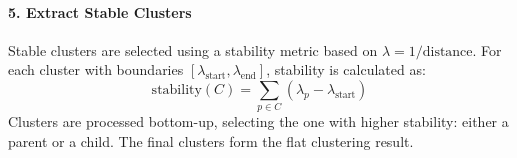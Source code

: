 \paragraph{5. Extract Stable Clusters}
Stable clusters are selected using a stability metric based on $\lambda = 1/\text{distance}$. For each cluster with boundaries $[\lambda_{\text{start}}, \lambda_{\text{end}}]$, stability is calculated as:
\begin{equation}
\text{stability}(C) = \sum_{p \in C} (\lambda_p - \lambda_{\text{start}})
\end{equation}
Clusters are processed bottom-up, selecting the one with higher stability: either a parent or a child. The final clusters form the flat clustering result.
